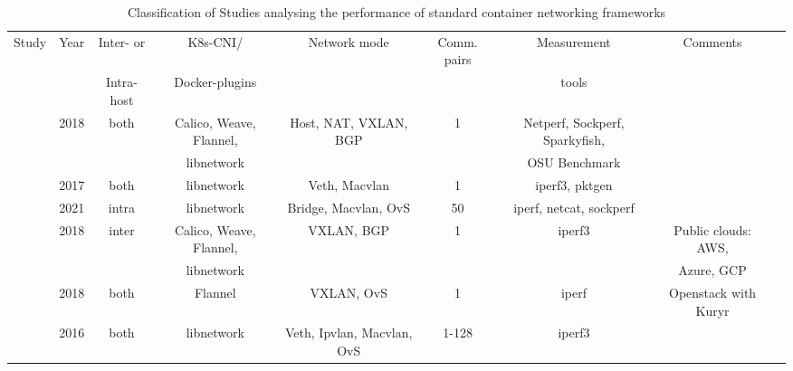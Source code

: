 \documentclass[conference]{IEEEtran}
\begin{document}
\begin{table}[!h]

 \begin{center}

   \caption{ Classification of Studies analysing the performance of standard container networking frameworks}\label{tab:1}

   \begin{tabular}{c c c c c c c c c}
     \hline
     Study & Year & Inter- or & K8s-CNI/& Network mode & Comm. pairs & Measurement& Comments  \\ 
      &  & Intra-host & Docker-plugins & & & tools &   \\ 
     \hline
     \cite{IEEE_INFOCOM_2018:K. Suo} & 2018 & both & Calico, Weave, Flannel, & Host, NAT, VXLAN, BGP & 1 & Netperf, Sockperf, Sparkyfish,& & \\
     & & & libnetwork & & & OSU Benchmark & & \\     
     \cite{HotConNet_17:Zhao} & 2017 & both & libnetwork & Veth, Macvlan & 1 & iperf3, pktgen & & \\
     \cite{Boeira:2021} & 2021 & intra & libnetwork & Bridge, Macvlan, OvS & 50 & iperf, netcat, sockperf & &\\
     \cite{Bankston:2018} & 2018 & inter & Calico, Weave, Flannel, & VXLAN, BGP & 1 & iperf3 & Public clouds: AWS,\\
      & & & libnetwork & & & & Azure, GCP \\
     \cite{ICTC_2018:Park} & 2018 & both & Flannel & VXLAN, OvS & 1 & iperf & Openstack with Kuryr\\
     \cite{NOMS_2016:Claassen} & 2016 & both & libnetwork & Veth, Ipvlan, Macvlan, OvS & 1-128 & iperf3 & &\\
     \hline 

   \end{tabular}

 \end{center}
\end{table} 
\end{document}

